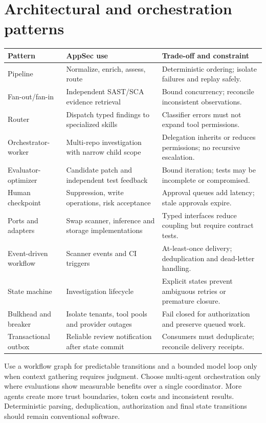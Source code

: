 \documentclass[11pt,letterpaper]{article}
\begin{document}
\section{Architectural and orchestration patterns}
\begin{longtable}{@{}>{\raggedright\arraybackslash}p{.24\linewidth}>{\raggedright\arraybackslash}p{.34\linewidth}>{\raggedright\arraybackslash}p{.34\linewidth}@{}}
\toprule Pattern & AppSec use & Trade-off and constraint\\\midrule\endhead
Pipeline & Normalize, enrich, assess, route & Deterministic ordering; isolate failures and replay safely.\\
Fan-out/fan-in & Independent SAST/SCA evidence retrieval & Bound concurrency; reconcile inconsistent observations.\\
Router & Dispatch typed findings to specialized skills & Classifier errors must not expand tool permissions.\\
Orchestrator-worker & Multi-repo investigation with narrow child scope & Delegation inherits or reduces permissions; no recursive escalation.\\
Evaluator-optimizer & Candidate patch and independent test feedback & Bound iteration; tests may be incomplete or compromised.\\
Human checkpoint & Suppression, write operations, risk acceptance & Approval queues add latency; stale approvals expire.\\
Ports and adapters & Swap scanner, inference and storage implementations & Typed interfaces reduce coupling but require contract tests.\\
Event-driven workflow & Scanner events and CI triggers & At-least-once delivery; deduplication and dead-letter handling.\\
State machine & Investigation lifecycle & Explicit states prevent ambiguous retries or premature closure.\\
Bulkhead and breaker & Isolate tenants, tool pools and provider outages & Fail closed for authorization and preserve queued work.\\
Transactional outbox & Reliable review notification after state commit & Consumers must deduplicate; reconcile delivery receipts.\\
\bottomrule
\end{longtable}
Use a workflow graph for predictable transitions and a bounded model loop only when context gathering requires judgment. Choose multi-agent orchestration only where evaluations show measurable benefits over a single coordinator. More agents create more trust boundaries, token costs and inconsistent results. Deterministic parsing, deduplication, authorization and final state transitions should remain conventional software.
\end{document}
